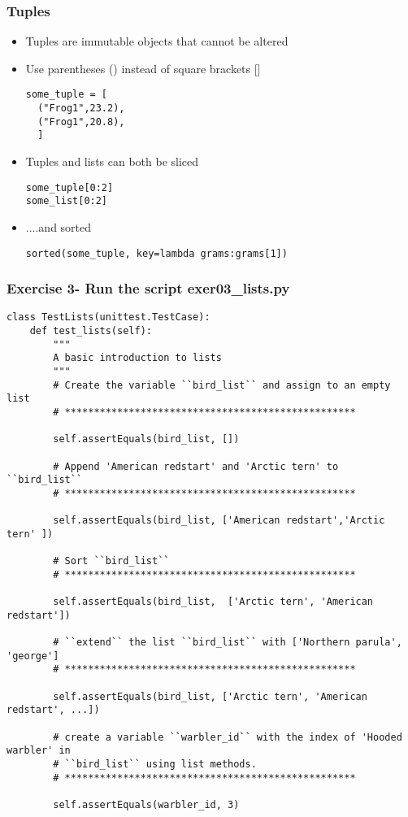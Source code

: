 \documentclass{beamer}
\newcommand\Fontvi{\fontsize{6}{7.2}\selectfont}
\begin{document}
\begin{frame}[fragile]
\frametitle{Tuples}
\begin{itemize}
\item Tuples are immutable objects that cannot be altered
\item Use parentheses () instead of square brackets []
\begin{lstlisting}
some_tuple = [
  ("Frog1",23.2),
  ("Frog1",20.8),
  ]
\end{lstlisting}
\item Tuples and lists can both be sliced
\begin{lstlisting}
some_tuple[0:2]
some_list[0:2]
\end{lstlisting}
\item ....and sorted
\begin{lstlisting}
sorted(some_tuple, key=lambda grams:grams[1])
\end{lstlisting}
\end{itemize}
\end{frame}

\begin{frame}[fragile]
\frametitle{Exercise 3- Run the script exer03\_lists.py}
\Fontvi
\begin{lstlisting}
class TestLists(unittest.TestCase):
    def test_lists(self):
        """
        A basic introduction to lists
        """
        # Create the variable ``bird_list`` and assign to an empty list
        # **************************************************

        self.assertEquals(bird_list, [])

        # Append 'American redstart' and 'Arctic tern' to ``bird_list``
        # **************************************************

        self.assertEquals(bird_list, ['American redstart','Arctic tern' ])

        # Sort ``bird_list``
        # **************************************************

        self.assertEquals(bird_list,  ['Arctic tern', 'American redstart'])

        # ``extend`` the list ``bird_list`` with ['Northern parula', 'george']
        # **************************************************

        self.assertEquals(bird_list, ['Arctic tern', 'American redstart', ...])

        # create a variable ``warbler_id`` with the index of 'Hooded warbler' in
        # ``bird_list`` using list methods.
        # **************************************************

        self.assertEquals(warbler_id, 3)
\end{lstlisting}
\end{frame}
\end{document}

